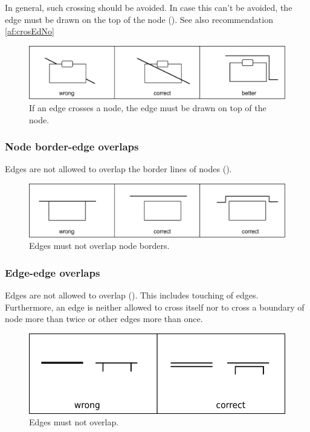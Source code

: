 In general, such crossing should be avoided.  In case this can't be avoided, the edge must be drawn on the top of the node (). See also recommendation \ref{af:crosEdNo} 

\begin{figure}[!ht]
  \centering
  \includegraphics[scale=0.4]{images/build/layout-node-edge.pdf}
  \caption{If an edge crosses a node, the edge must be drawn on top  of the node.}\label{fig:af:layout2}
\end{figure}

\subsubsection{Node border-edge overlaps}

Edges are not allowed to overlap the border lines of nodes ().

\begin{figure}[!ht]
  \centering
  \includegraphics[scale=0.4]{images/build/layout-node-border-edge.pdf}
  \caption{Edges must not overlap node borders.}\label{fig:af:layout3}
\end{figure}

\subsubsection{Edge-edge overlaps}

Edges are not allowed to overlap (). This includes touching of edges. Furthermore, an edge is neither allowed to cross itself nor to cross
a boundary of node more than twice or other edges more than once.

\begin{figure}[!ht]
  \centering
  \includegraphics[scale=0.4]{images/layout-edge-edge}
  \caption{Edges must not overlap.}\label{fig:af:layout4}
\end{figure}

